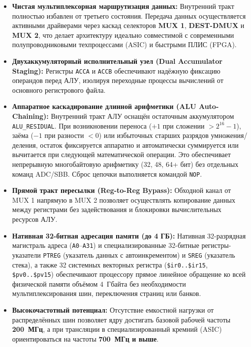 \documentclass[11pt,a4paper]{article}
\newcommand{\reg}[1]{\texttt{#1}}
\begin{document}
\begin{itemize}
  \item \textbf{Чистая мультиплексорная маршрутизация данных:} Внутренний тракт полностью избавлен от третьего состояния. Передача данных осуществляется активными драйверами через каскад селекторов \textbf{MUX 1}, \textbf{DEST-DMUX} и \textbf{MUX 2}, что делает архитектуру идеально совместимой с современными полупроводниковыми техпроцессами (ASIC) и быстрыми ПЛИС (FPGA).
  \item \textbf{Двухаккумуляторный исполнительный узел (Dual Accumulator Staging):} Регистры \reg{ACCA} и \reg{ACCB} обеспечивают надёжную фиксацию операндов перед АЛУ, изолируя переходные процессы вычислений от основного регистрового файла.
  \item \textbf{Аппаратное каскадирование длинной арифметики (ALU Auto-Chaining):} Внутренний тракт АЛУ оснащён остаточным аккумулятором \reg{ALU\_RESIDUAL}. При возникновении переноса ($+1$ при сложении $>2^{16}-1$), заёма ($-1$ при разности $<0$) или избыточных старших разрядов умножения/деления, остаток фиксируется аппаратно и автоматически суммируется или вычитается при следующей математической операции. Это обеспечивает непрерывную многобайтовую арифметику (32, 48, 64+ бит) без отдельных команд ADC/SBB. Сброс цепочки выполняется командой \texttt{NOP}.
  \item \textbf{Прямой тракт пересылки (Reg-to-Reg Bypass):} Обходной канал от MUX 1 напрямую в MUX 2 позволяет осуществлять копирование данных между регистрами без задействования и блокировки вычислительных ресурсов АЛУ.
  \item \textbf{Нативная 32-битная адресация памяти (до 4 ГБ):} Нативная 32-разрядная магистраль адреса (\texttt{A0}--\texttt{A31}) и специализированные 32-битные регистры-указатели \reg{PTREG} (указатель данных с автоинкрементом) и \reg{SREG} (указатель стека), а также 32 системных векторных регистра (\texttt{\$ir0..\$ir15}, \texttt{\$pv0..\$pv15}) обеспечивают процессору прямое линейное обращение ко всей физической памяти объёмом 4~Гбайта без необходимости мультиплексирования шин, переключения страниц или банков.
  \item \textbf{Высокочастотный потенциал:} Отсутствие емкостной нагрузки от распределённых шин позволяет ядру достигать базовой рабочей частоты \textbf{200~МГц}, а при трансляции в специализированный кремний (ASIC) ориентироваться на частоты \textbf{700~МГц и выше}.
\end{itemize}
\end{document}
